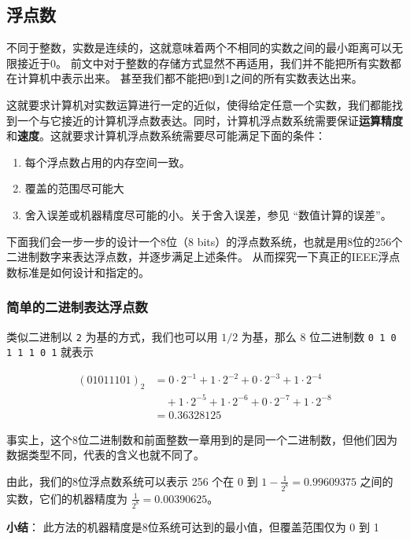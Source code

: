 \subsection{浮点数}

不同于整数，实数是连续的，这就意味着两个不相同的实数之间的最小距离可以无限接近于0。 前文中对于整数的存储方式显然不再适用，我们并不能把所有实数都在计算机中表示出来。 甚至我们都不能把0到1之间的所有实数表达出来。

这就要求计算机对实数运算进行一定的近似，使得给定任意一个实数，我们都能找到一个与它接近的计算机浮点数表达。同时，计算机浮点数系统需要保证\textbf{运算精度}和\textbf{速度}。这就要求计算机浮点数系统需要尽可能满足下面的条件：

\begin{enumerate}
\item 每个浮点数占用的内存空间一致。
\item 覆盖的范围尽可能大
\item 舍入误差或机器精度尽可能的小。关于舍入误差，参见 “数值计算的误差”。
\end{enumerate}

下面我们会一步一步的设计一个8位（8 bits）的浮点数系统，也就是用8位的256个二进制数字来表达浮点数，并逐步满足上述条件。 从而探究一下真正的IEEE浮点数标准是如何设计和指定的。

\subsubsection{简单的二进制表达浮点数}

类似二进制以 \verb|2| 为基的方式，我们也可以用 $1/2$ 为基，那么 8 位二进制数 \verb|0 1 0 1 1 1 0 1| 就表示

\begin{equation}
\begin{aligned}
(01011101)_2 &= 0\cdot2^{-1}+1\cdot2^{-2}+0\cdot2^{-3}+1\cdot2^{-4}\\
 &\quad +1\cdot2^{-5}+1\cdot2^{-6}+0\cdot2^{-7}+1\cdot2^{-8}\\
 &= 0.36328125
\end{aligned}
\end{equation}

事实上，这个8位二进制数和前面整数一章用到的是同一个二进制数，但他们因为数据类型不同，代表的含义也就不同了。

由此，我们的8位浮点数系统可以表示 256 个在 0 到  $1-\frac{1}{2^8}=0.99609375$  之间的实数，它们的机器精度为  $\frac{1}{2^8}=0.00390625$。

\textbf{小结}： 此方法的机器精度是8位系统可达到的最小值，但覆盖范围仅为 0 到 1

